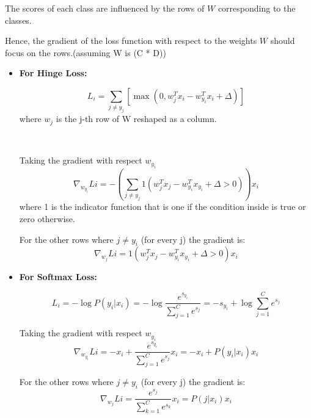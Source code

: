 \documentclass{article}
\numberwithin{equation}{section}
\begin{document}
\begin{CJK}{UTF8}{gbsn}
\begin{enumerate}
        The scores of each class are influenced by the rows of \(W\) corresponding to the classes.\par
        Hence, the gradient of the loss function with respect to the weights \(W\) should focus on the rows.(assuming W is (C * D))\par
        
        \begin{itemize}
            \item \textbf{For Hinge Loss:}\par
            \begin{equation*}
                L_i = \sum_{j \neq y_j} [\max(0, w^T_j x_i - w^T_{y_i} x_i + \Delta)]
            \end{equation*}
            where \(w_j\) is the j-th row of W reshaped as a column.\par
            \
            
            Taking the gradient with respect \(w_{y_i}\)
            \begin{equation}
                \nabla_{w_{y_i}} Li = - (\sum_{j \neq y_j}1(w^T_j x_j - w^T_{y_i} x_{y_i} + \Delta > 0)) x_i
            \end{equation}
            where 1 is the indicator function that is one if the condition inside is true or zero otherwise. 
        
            For the other rows where \(j \neq y_i \) (for every j) the gradient is:
            \begin{equation}
                \nabla_{w_j} Li = 1(w^T_j x_j - w^T_{y_i} x_{y_i} + \Delta > 0)  x_i
            \end{equation}

            \item \textbf{For Softmax Loss:}\par
            \begin{equation*}
                L_i = -\log P(y_i | x_i) = -\log \frac{e^{s_{y_i}}}{\sum_{j=1}^{C} e^{s_j}} = -s_{y_i} + \log \sum_{j=1}^{C} e^{s_j}
            \end{equation*}

            Taking the gradient with respect \(w_{y_i}\)
            \begin{equation}
                \nabla_{w_{y_i}} Li = -x_i + \frac{e^{s_{y_i}}}{\sum_{j=1}^{C} e^{s_j}} x_i = -x_i + P(y_i | x_i) x_i
            \end{equation}
            
            For the other rows where \(j \neq y_i \) (for every j) the gradient is:
            \begin{equation}
                \nabla_{w_j} Li = \frac{e^{s_j}}{\sum_{k=1}^{C} e^{s_k}} x_i = P(j | x_i) x_i
            \end{equation}
        

\end{itemize}
\end{enumerate}
\end{CJK}
\end{document}
